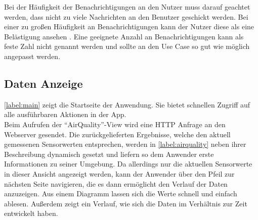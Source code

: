 Bei der Häufigkeit der Benachrichtigungen an den Nutzer muss darauf geachtet werden, dass nicht zu viele Nachrichten an den Benutzer geschickt werden. Bei einer zu großen Häufigkeit an Benachrichtigungen kann der Nutzer diese als eine Belästigung ansehen \cite{gadgets:amountnotifications}. Eine geeignete Anzahl an Benachrichtigungen kann als feste Zahl nicht genannt werden und sollte an den Use Case so gut wie möglich angepasst werden.

\subsection{Daten Anzeige}
\autoref{label:main} zeigt die Startseite der Anwendung. Sie bietet schnellen Zugriff auf alle ausführbaren Aktionen in der App.
\\Beim Aufrufen der \enquote{AirQuality}-View wird eine \ac{HTTP} Anfrage an den Webserver gesendet. Die zurückgelieferten Ergebnisse, welche den aktuell gemessenen Sensorwerten entsprechen, werden in \autoref{label:airquality} neben ihrer Beschreibung dynamisch gesetzt und liefern so dem Anwender erste Informationen zu seiner Umgebung. Da allerdings nur die aktuellen Sensorwerte in dieser Ansicht angezeigt werden, kann der Anwender über den Pfeil zur nächsten Seite navigieren, die es dann ermöglicht den Verlauf der Daten anzuzeigen. Aus einem Diagramm lassen sich die Werte schnell und einfach ablesen. Außerdem zeigt ein Verlauf, wie sich die Daten im Verhältnis zur Zeit entwickelt haben.

